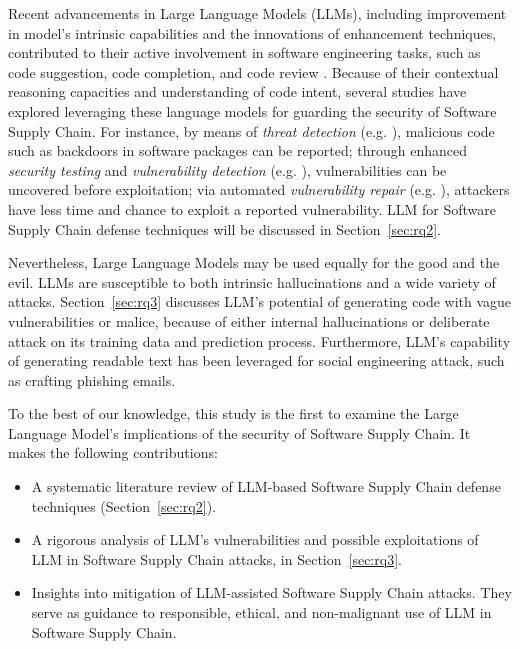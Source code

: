 \par Recent advancements in Large Language Models (LLMs), including
improvement in model's intrinsic
capabilities\citep{llmsurvey,overviewllm,csllm} and the innovations of
enhancement techniques, contributed to their active involvement in
software engineering tasks, such as code suggestion, code completion, and
code review \citep{llm4se, llm4se2}. Because of their contextual reasoning
capacities and understanding of code intent, several studies have
explored leveraging these language models for guarding the security
of Software Supply Chain. For instance, by means of 
\textit{threat detection} (e.g. \citep{llmbackdoordet,singla2023empiricalstudyusinglarge,syed2025agenticaiautonomousdefense}),
malicious code such as backdoors in software packages can be 
reported; through enhanced \textit{security testing} and \textit{vulnerability detection}
(e.g. \citep{11022932,10695665,10628694}), vulnerabilities 
can be uncovered before exploitation; via automated \textit{vulnerability repair}
(e.g. \citep{vulrepairusingllm,vulmaster}), attackers have less time and chance
to exploit a reported vulnerability. LLM for Software Supply Chain
defense techniques will be discussed in Section~\ref{sec:rq2}.

\par Nevertheless, Large Language Models may be used equally for the good
and the evil. LLMs are susceptible to both intrinsic hallucinations and
a wide variety of attacks. Section~\ref{sec:rq3} discusses LLM's potential
of generating code with vague vulnerabilities or malice, because
of either internal hallucinations or deliberate attack on its
training data and prediction process. Furthermore, LLM's capability of
generating readable text has been leveraged for social engineering attack,
such as crafting phishing emails.

\par To the best of our knowledge, this study is the first to examine the
Large Language Model's implications of the security of Software Supply Chain.
It makes the following contributions:

\begin{itemize}
  \item A systematic literature review of LLM-based
  Software Supply Chain defense techniques (Section~\ref{sec:rq2}).

  \item A rigorous analysis of LLM's vulnerabilities and possible
  exploitations of LLM in Software Supply Chain attacks, in Section~\ref{sec:rq3}.

  \item Insights into mitigation of LLM-assisted Software Supply Chain
  attacks. They serve as guidance to responsible, ethical, and non-malignant
  use of LLM in Software Supply Chain.
\end{itemize}

